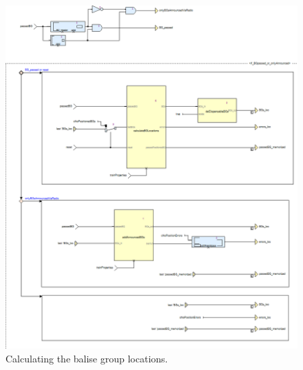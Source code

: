 \begin{figure}
\centering
\includegraphics[scale=0.5]{../images/calculateTrainPosition_calcBGs.png}
\caption{Calculating the balise group locations.}
\end{figure}

